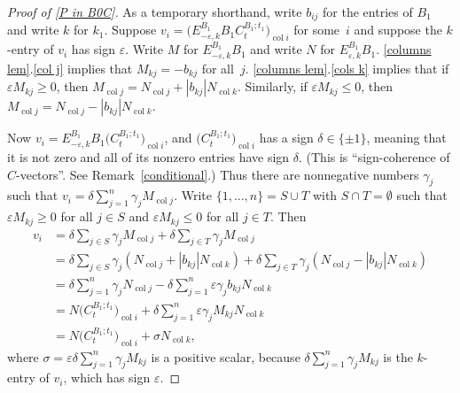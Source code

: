 \documentclass{amsart}
\theoremstyle{definition}
\theoremstyle{remark}
\numberwithin{equation}{section}
\newcommand{\ep}{\varepsilon}
\newcommand{\col}{\operatorname{col}}
\newcommand{\set}[1]{{\lbrace #1 \rbrace}}
\newcommand{\0}{{\mathbf{0}}}
\begin{document}
\begin{proof}[Proof of \cref{P in B0C}]
As a temporary shorthand, write $b_{ij}$ for the entries of $B_1$ and write $k$ for $k_1$.
Suppose $v_i=\bigl(E^{B_1}_{-\ep,k}B_1C_t^{B_1;t_1}\bigr)_{\col i}$ for some~$i$ and suppose the $k$-entry of $v_i$ has sign $\ep$.
Write $M$ for $E^{B_1}_{-\ep,k}B_1$ and write $N$ for $E^{B_1}_{\ep,k}B_1$.
\cref{columns lem}.\ref{col j} implies that $M_{kj}=-b_{kj}$ for all~$j$.
\cref{columns lem}.\ref{cols k} implies that if $\ep M_{kj}\ge0$, then $M_{\col j}=N_{\col j}+|b_{kj}|N_{\col k}$.
Similarly, if $\ep M_{kj}\le0$, then $M_{\col j}=N_{\col j}-|b_{kj}|N_{\col k}$.

Now $v_i=E^{B_1}_{-\ep,k}B_1\bigl(C_t^{B_1;t_1}\bigr)_{\col i}$, and $\bigl(C_t^{B_1;t_1}\bigr)_{\col i}$ has a sign $\delta\in\set{\pm1}$, meaning that it is not zero and all of its nonzero entries have sign $\delta$.
(This is ``sign-coherence of $C$-vectors''.  
See Remark~\ref{conditional}.)
Thus there are nonnegative numbers $\gamma_j$ such that $v_i=\delta\sum_{j=1}^n\gamma_jM_{\col j}$.
Write $\set{1,\ldots,n}=S\cup T$ with $S\cap T=\emptyset$ such that $\ep M_{kj}\ge0$ for all $j\in S$ and $\ep M_{kj}\le0$ for all $j\in T$.
Then
\begin{align*}
v_i
&=\delta\sum_{j\in S}\gamma_jM_{\col j}+\delta\sum_{j\in T}\gamma_jM_{\col j}\\
&=\delta\sum_{j\in S}\gamma_j(N_{\col j}+|b_{kj}|N_{\col k})+\delta\sum_{j\in T}\gamma_j(N_{\col j}-|b_{kj}|N_{\col k})\\
&=\delta\sum_{j=1}^n\gamma_jN_{\col j}-\delta\sum_{j=1}^n\ep\gamma_jb_{kj}N_{\col k}\\
&=N\bigl(C_t^{B_1;t_1}\bigr)_{\col i}+\delta\sum_{j=1}^n\ep\gamma_jM_{kj}N_{\col k}\\
&=N\bigl(C_t^{B_1;t_1}\bigr)_{\col i}+\sigma N_{\col k},
\end{align*}
where $\sigma=\ep\delta\sum_{j=1}^n\gamma_jM_{kj}$ is a positive scalar, because $\delta\sum_{j=1}^n\gamma_jM_{kj}$ is the $k$-entry of $v_i$, which has sign $\ep$.


\end{proof}
\end{document}
